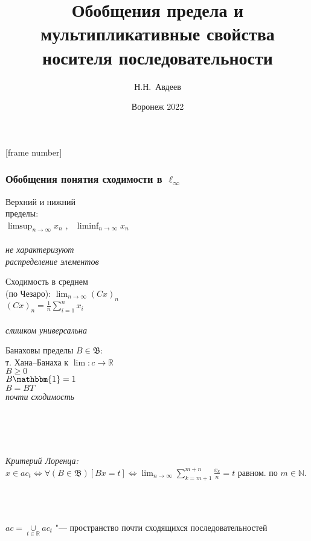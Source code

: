 \documentclass[10pt,pdf,hyperref={unicode},aspectratio=169,color={usenames, dvipsnames}]{beamer}\usepackage{amsmath}
\theoremstyle{definition}
\begin{document}
\title{
	Обобщения предела и мультипликативные свойства носителя последовательности
}
\author{Н.Н.~Авдеев}
\date{Воронеж 2022}

\maketitle

[frame number]

\begin{frame}
	\frametitle{Обобщения понятия сходимости в $\ell_\infty$}
	\begin{varwidth}[t]{\linewidth}
		\centering
		Верхний и нижний
		\\
		пределы:
		\\
		$\displaystyle \limsup_{n\to\infty} x_n$
		,~
		$\displaystyle \liminf_{n\to\infty} x_n$
		\\~\\
		\emph{
			не характеризуют
			\\
			распределение элементов
		}
	\end{varwidth}
	\hfill
	\begin{varwidth}[t]{\linewidth}
		\centering
		Сходимость в среднем
		\\
		(по Чезаро):
		$\displaystyle \lim_{n\to\infty} (Cx)_n$
		\\
		$\displaystyle (Cx)_n = \frac1n\sum_{i=1}^n x_i$
		\\~\\
		\emph{слишком универсальна}
	\end{varwidth}
	\hfill
	\begin{varwidth}[t]{\linewidth}
		\centering
		Банаховы пределы $B\in \mathfrak{B}$:
		\\
		т. Хана--Банаха к $\lim: c\to\mathbb R$
		\\
			$B \geqslant 0$
		\\
			$B\mathbbm{1} = 1$
		\\
			$B=BT$
		\\
		\emph{почти сходимость}
	\end{varwidth}
	\\~\\~\\
	\begin{varwidth}[t]{\linewidth}
		\centering
		\emph{Критерий Лоренца:}
		$\displaystyle
			x\in ac_t
			\Leftrightarrow
			\forall(B\in\mathfrak{B})[Bx = t]
			\Leftrightarrow
			\lim_{n\to\infty}  \sum_{k=m+1}^{m+n} \frac{x_k}n = t
		$
		равном. по $m\in\mathbb{N}$.
	\end{varwidth}
	\\~\\
	\vspace{0.8em}
	\begin{varwidth}[t]{\linewidth}
		$\displaystyle ac = \mathop{\cup}\limits_{t\in\mathbb R} ac_t$ "--- пространство почти сходящихся последовательностей
	\end{varwidth}
\end{frame}
\end{document}
